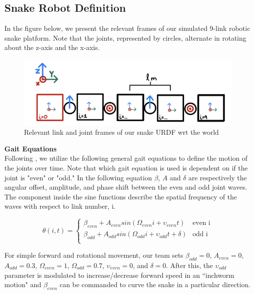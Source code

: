 \documentclass[letterpaper, 10 pt, conference]{ieeeconf}  %
\begin{document}
\subsection{Snake Robot Definition}
In the figure below, we present the relevant frames of our simulated 9-link robotic snake platform. Note that the joints, represented by circles, alternate in rotating about the z-axis and the x-axis. 

\begin{figure}[H]
    \centering
    \includegraphics[width = 1\linewidth]{urdf.jpeg}
    \caption{Relevant link and joint frames of our snake URDF wrt the world}
    \label{fig:urdf}
\end{figure}

\noindent \textbf{Gait Equations}\\
Following \cite{state_est_snake_robots}, we utilize the following general gait equations to define the motion of the joints over time. Note that which gait equation is used is dependent on if the joint is "even" or "odd." In the following equation $\beta$, $A$ and $\delta$ are respectively the angular offset, amplitude, and phase shift between the even and odd joint waves. The component inside the sine functions describe the spatial frequency of the waves with respect to link number, i. 

\begin{equation}
    \theta(i, t) = \begin{cases} 
      \beta_{even} + A_{even}sin(\Omega_{even}i + \upsilon_{even}t)& \text{even i} \\
      \beta_{odd} + A_{odd}sin(\Omega_{odd}i + \upsilon_{odd}t + \delta)& \text{odd i}  \\
   \end{cases}
\end{equation}

For simple forward and rotational movement, our team sets $\beta_{odd}=0$, $A_{even} = 0$, $A_{odd} = 0.3$, $\Omega_{even} = 1$, $\Omega_{odd} = 0.7$, $\upsilon_{even} =0$, and $\delta=0$. After this, the $\upsilon_{odd}$ parameter is modulated to increase/decrease forward speed in an ``inchworm motion" and $\beta_{even}$ can be commanded to curve the snake in a particular direction.  \\
\end{document}
